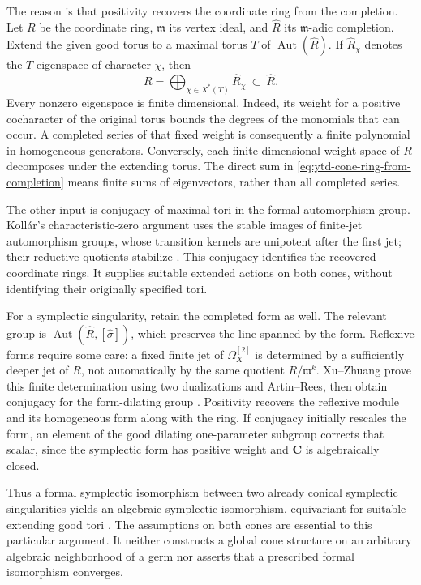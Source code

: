 The reason is that positivity recovers the coordinate ring from
the completion. Let $R$ be the coordinate ring, $\mathfrak m$ its
vertex ideal, and $\widehat R$ its $\mathfrak m$-adic completion.
Extend the given good torus to a maximal torus $T$ of
$\operatorname{Aut}(\widehat R)$. If $\widehat R_\chi$ denotes
the $T$-eigenspace of character $\chi$, then
\[
\tag{68.23bs}\label{eq:ytd-cone-ring-from-completion}
 R=\bigoplus_{\chi\in X^*(T)}\widehat R_\chi
       \ \subset\ \widehat R.
\]
Every nonzero eigenspace is finite dimensional. Indeed, its
weight for a positive cocharacter of the original torus bounds
the degrees of the monomials that can occur. A completed series
of that fixed weight is consequently a finite polynomial in
homogeneous generators. Conversely, each finite-dimensional
weight space of $R$ decomposes under the extending torus.
The direct sum in \eqref{eq:ytd-cone-ring-from-completion}
means finite sums of eigenvectors, rather than all completed
series.

The other input is conjugacy of maximal tori in the formal
automorphism group. Koll\'ar's characteristic-zero argument
uses the stable images of finite-jet automorphism groups,
whose transition kernels are unipotent after the first jet;
their reductive quotients stabilize
\cite[Section~8, paragraph~57]{Kollar23InvariantAutomorphismsV2}.
This conjugacy identifies the recovered coordinate rings.
It supplies suitable extended actions on both cones, without
identifying their originally specified tori.

For a symplectic singularity, retain the completed form as well.
The relevant group is
$\operatorname{Aut}(\widehat R,[\widehat\sigma])$, which
preserves the line spanned by the form. Reflexive forms require
some care: a fixed finite jet of
$\Omega_X^{[2]}$ is determined by a sufficiently deeper jet
of $R$, not automatically by the same quotient $R/\mathfrak m^k$.
Xu--Zhuang prove this finite determination using two dualizations
and Artin--Rees, then obtain conjugacy for the form-dilating
group \cite[Lemmas~6.6--6.7]{XuZhuang26StableFormsV2}.
Positivity recovers the reflexive module and its homogeneous
form along with the ring. If conjugacy initially rescales the
form, an element of the good dilating one-parameter subgroup
corrects that scalar, since the symplectic form has positive
weight and $\mathbf C$ is algebraically closed.

Thus a formal symplectic isomorphism between two already
conical symplectic singularities yields an algebraic symplectic
isomorphism, equivariant for suitable extending good tori
\cite[Proposition~6.5]{XuZhuang26StableFormsV2}.
The assumptions on both cones are essential to this particular
argument. It neither constructs a global cone structure on an
arbitrary algebraic neighborhood of a germ nor asserts that
a prescribed formal isomorphism converges.

